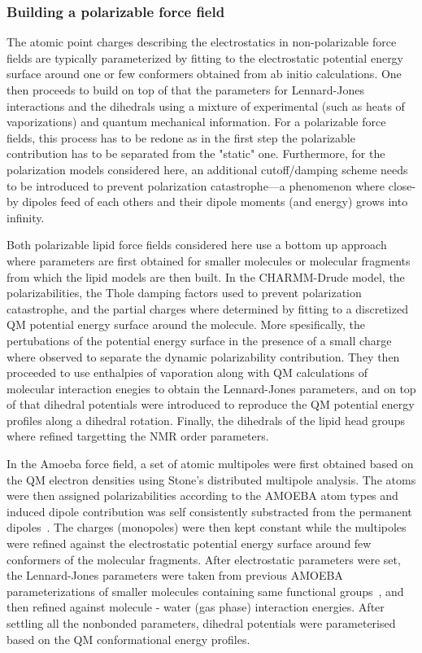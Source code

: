 \documentclass[journal=jacsat,manuscript=article,layout=singlecolumn]{achemso}
\begin{document}
\subsubsection{Building a polarizable force field}

The atomic point charges describing the electrostatics in non-polarizable force fields are typically parameterized by fitting to the electrostatic potential energy surface around one or few conformers obtained from ab initio calculations. One then proceeds to build on top of that the parameters for Lennard-Jones interactions and the dihedrals using a mixture of experimental (such as heats of vaporizations) and quantum mechanical information. For a polarizable force fields, this process has to be redone as in the first step the polarizable contribution has to be separated from the "static" one. Furthermore, for the polarization models considered here, an additional cutoff/damping scheme needs to be introduced to prevent polarization catastrophe---a phenomenon where close-by dipoles feed of each others and their dipole moments (and energy) grows into infinity.

Both polarizable lipid force fields considered here use a bottom up approach where parameters are first obtained for smaller molecules or molecular fragments from which the lipid models are then built.  In the CHARMM-Drude model, the polarizabilities, the Thole damping factors used to prevent polarization catastrophe, and the partial charges where determined by fitting to a discretized QM potential energy surface around the molecule. More spesifically, the pertubations of the potential energy surface in the presence of a small charge where observed to separate the dynamic polarizability contribution. They then proceeded to use enthalpies of vaporation along with QM calculations of molecular interaction enegies to obtain the Lennard-Jones parameters, and on top of that dihedral potentials were introduced to reproduce the QM potential energy profiles along a dihedral rotation. Finally, the dihedrals of the lipid head groups where refined targetting the NMR order parameters.

In the Amoeba force field, a set of atomic multipoles were first obtained based on the QM electron densities using Stone's distributed multipole analysis. The atoms were then assigned polarizabilities according to the AMOEBA atom types and   induced dipole contribution was self consistently substracted from the permanent dipoles~\cite{shi2013proteinamoeba}. The charges (monopoles) were then kept constant while the multipoles were refined against the electrostatic potential energy surface around few conformers of the molecular fragments. %
After electrostatic parameters were set, the Lennard-Jones parameters were taken from previous AMOEBA parameterizations of smaller molecules containing same functional groups~\cite{Ren2011polorganic,shi2011hydration}, and then refined against molecule - water (gas phase) interaction energies. After settling all the nonbonded parameters, dihedral potentials were parameterised based on the QM conformational energy profiles.
\end{document}
